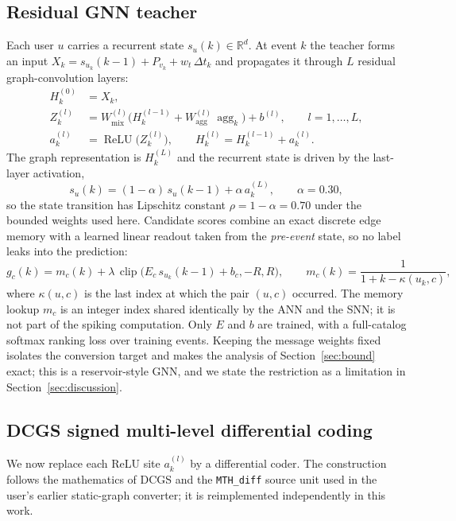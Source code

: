 \documentclass[preprint,12pt]{elsarticle}
\begin{document}
\subsection{Residual GNN teacher}
\label{sec:teacher}

Each user $u$ carries a recurrent state $s_u(k)\in\mathbb R^{d}$. At event $k$ the teacher forms an input $X_k=s_{u_k}(k-1)+P_{v_k}+w_t\,\Delta t_k$ and propagates it through $L$ residual graph-convolution layers:
\begin{align}
H^{(0)}_k &= X_k,\\
Z^{(l)}_k &= W^{(l)}_{\mathrm{mix}}\Big(H^{(l-1)}_k+W^{(l)}_{\mathrm{agg}}\,\operatorname{agg}_k\Big)+b^{(l)},
\qquad l=1,\ldots,L,\\
a^{(l)}_k &= \operatorname{ReLU}\big(Z^{(l)}_k\big),\qquad
H^{(l)}_k = H^{(l-1)}_k + a^{(l)}_k .
\label{eq:gnn}
\end{align}
The graph representation is $H^{(L)}_k$ and the recurrent state is driven by the last-layer activation,
\begin{equation}
s_u(k)=(1-\alpha)\,s_u(k-1)+\alpha\,a^{(L)}_k,\qquad \alpha=0.30,
\label{eq:state}
\end{equation}
so the state transition has Lipschitz constant $\rho=1-\alpha=0.70$ under the bounded weights used here. Candidate scores combine an exact discrete edge memory with a learned linear readout taken from the \emph{pre-event} state, so no label leaks into the prediction:
\begin{equation}
g_c(k)=m_c(k)+\lambda\,\operatorname{clip}\big(E_c\,s_{u_k}(k-1)+b_c,-R,R\big),
\qquad m_c(k)=\frac{1}{1+k-\kappa(u_k,c)},
\label{eq:readout}
\end{equation}
where $\kappa(u,c)$ is the last index at which the pair $(u,c)$ occurred. The memory lookup $m_c$ is an integer index shared identically by the ANN and the SNN; it is not part of the spiking computation. Only $E$ and $b$ are trained, with a full-catalog softmax ranking loss over training events. Keeping the message weights fixed isolates the conversion target and makes the analysis of Section~\ref{sec:bound} exact; this is a reservoir-style GNN, and we state the restriction as a limitation in Section~\ref{sec:discussion}.

\subsection{DCGS signed multi-level differential coding}
\label{sec:dcgs}

We now replace each ReLU site $a^{(l)}_k$ by a differential coder. The construction follows the mathematics of DCGS \cite{huang2025dcgs} and the \texttt{MTH\_diff} source unit used in the user's earlier static-graph converter; it is reimplemented independently in this work.
\end{document}
